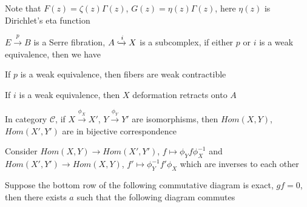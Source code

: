 \documentclass[main]{subfiles}
\begin{document}
\begin{remark}
Note that $F(z)=\zeta(z)\Gamma(z)$, $G(z)=\eta(z)\Gamma(z)$, here $\eta(z)$ is Dirichlet's eta function
\end{remark}

\begin{exercise}
$E\xrightarrow{p}B$ is a Serre fibration, $A\xhookrightarrow{i}X$ is a subcomplex, if either $p$ or $i$ is a weak equivalence, then we have
\begin{center}
\end{center}
\end{exercise}

\begin{solution}
If $p$ is a weak equivalence, then fibers are weak contractible \par
If $i$ is a weak equivalence, then $X$ deformation retracts onto $A$
\end{solution}

\begin{exercise}\label{X1,X2 iso and Y1,Y2 iso implies Hom(X1,Y1),Hom(X2,Y2) iso}
In category $\mathscr C$, if $X\xrightarrow{\phi_X} X'$, $Y\xrightarrow{\phi_Y} Y'$ are isomorphisms, then $Hom(X,Y)$, $Hom(X',Y')$ are in bijective correspondence
\end{exercise}

\begin{solution}
Consider $Hom(X,Y)\to Hom(X',Y')$, $f\mapsto\phi_Y f\phi_X^{-1}$ and $Hom(X',Y')\to Hom(X,Y)$, $f'\mapsto\phi_Y^{-1}f'\phi_X$ which are inverses to each other
\begin{center}
\end{center}
\end{solution}

\begin{exercise}
Suppose the bottom row of the following commutative diagram is exact, $gf=0$, then there exists $a$ such that the following diagram commutes
\begin{center}
\end{center}
\end{exercise}
\end{document}
